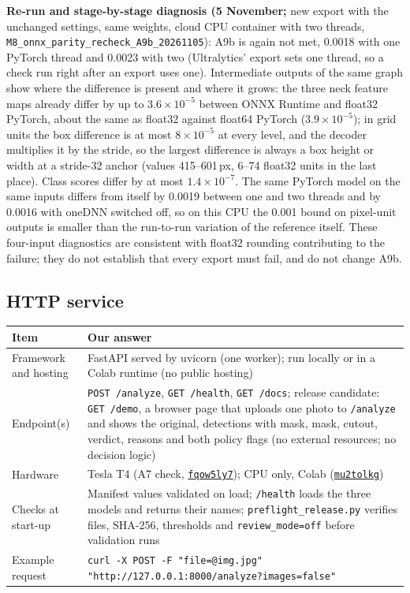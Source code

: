 \documentclass[11pt,a4paper]{article}
\newcommand{\run}[1]{\href{https://wandb.ai/yasser-alhajlah-kaust/smart-pet-vision/runs/#1}{\texttt{#1}}}
\newcommand{\ev}[1]{\nolinkurl{#1}}
\begin{document}
\textbf{Re-run and stage-by-stage diagnosis (5 November;} new export with the unchanged settings, same weights, cloud CPU container with two threads, \ev{M8_onnx_parity_recheck_A9b_20261105}): A9b is again not met, 0.0018 with one PyTorch thread and 0.0023 with two (Ultralytics' export sets one thread, so a check run right after an export uses one). Intermediate outputs of the same graph show where the difference is present and where it grows: the three neck feature maps already differ by up to $3.6\times10^{-5}$ between ONNX Runtime and float32 PyTorch, about the same as float32 against float64 PyTorch ($3.9\times10^{-5}$); in grid units the box difference is at most $8\times10^{-5}$ at every level, and the decoder multiplies it by the stride, so the largest difference is always a box height or width at a stride-32 anchor (values 415--601\,px, 6--74 float32 units in the last place). Class scores differ by at most $1.4\times10^{-7}$. The same PyTorch model on the same inputs differs from itself by 0.0019 between one and two threads and by 0.0016 with oneDNN switched off, so on this CPU the 0.001 bound on pixel-unit outputs is smaller than the run-to-run variation of the reference itself. These four-input diagnostics are consistent with float32 rounding contributing to the failure; they do not establish that every export must fail, and do not change A9b.

\subsection{HTTP service}

\begin{tabularx}{\linewidth}{@{}l Y@{}}
\toprule
Item & Our answer \\
\midrule
Framework and hosting & FastAPI served by uvicorn (one worker); run locally or in a Colab runtime (no public hosting) \\
Endpoint(s) & \texttt{POST /analyze}, \texttt{GET /health}, \texttt{GET /docs}; release candidate: \texttt{GET /demo}, a browser page that uploads one photo to \texttt{/analyze} and shows the original, detections with mask, mask, cutout, verdict, reasons and both policy flags (no external resources; no decision logic) \\
Hardware & Tesla T4 (A7 check, \run{fqow5ly7}); CPU only, Colab (\run{mu2tolkg}) \\
Checks at start-up & Manifest values validated on load; \texttt{/health} loads the three models and returns their names; \texttt{preflight\_release.py} verifies files, SHA-256, thresholds and \texttt{review\_mode=off} before validation runs \\
Example request & \texttt{curl -X POST -F "file=@img.jpg" "http://127.0.0.1:8000/analyze?images=false"} \\
\bottomrule
\end{tabularx}
\end{document}
